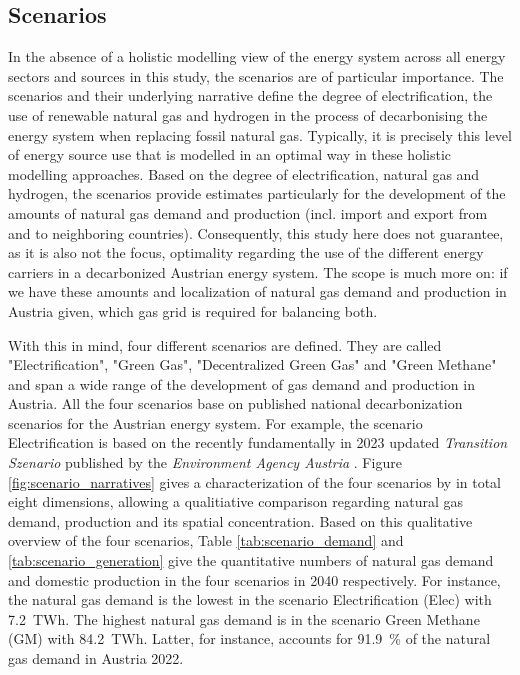 \subsection{Scenarios}\label{scenarios}
In the absence of a holistic modelling view of the energy system across all energy sectors and sources in this study, the scenarios are of particular importance. The scenarios and their underlying narrative define the degree of electrification, the use of renewable natural gas and hydrogen in the process of decarbonising the energy system when replacing fossil natural gas. Typically, it is precisely this level of energy source use that is modelled in an optimal way in these holistic modelling approaches. Based on the degree of electrification, natural gas and hydrogen, the scenarios provide estimates particularly for the development of the amounts of natural gas demand and production (incl. import and export from and to neighboring countries). Consequently, this study here does not guarantee, as it is also not the focus, optimality regarding the use of the different energy carriers in a decarbonized Austrian energy system. The scope is much more on: if we have these amounts and localization of natural gas demand and production in Austria given, which gas grid is required for balancing both.\vspace{0.3cm}

With this in mind, four different scenarios are defined. They are called "Electrification", "Green Gas", "Decentralized Green Gas" and "Green Methane" and span a wide range of the development of gas demand and production in Austria. All the four scenarios base on published national decarbonization scenarios for the Austrian energy system. For example, the scenario Electrification is based on the recently fundamentally in 2023 updated \textit{Transition Szenario} published by the \textit{Environment Agency Austria} \cite{umweltbundesamt}. Figure \ref{fig:scenario_narratives} gives a characterization of the four scenarios by in total eight dimensions, allowing a qualitiative comparison regarding natural gas demand, production and its spatial concentration. Based on this qualitative overview of the four scenarios, Table \ref{tab:scenario_demand} and \ref{tab:scenario_generation} give the quantitative numbers of natural gas demand and domestic production in the four scenarios in 2040 respectively. For instance, the natural gas demand is the lowest in the scenario Electrification (Elec) with \SI{7.2}{TWh}. The highest natural gas demand is in the scenario Green Methane (GM) with \SI{84.2}{TWh}. Latter, for instance, accounts for \SI{91.9}{\%} of the natural gas demand in Austria 2022. 


